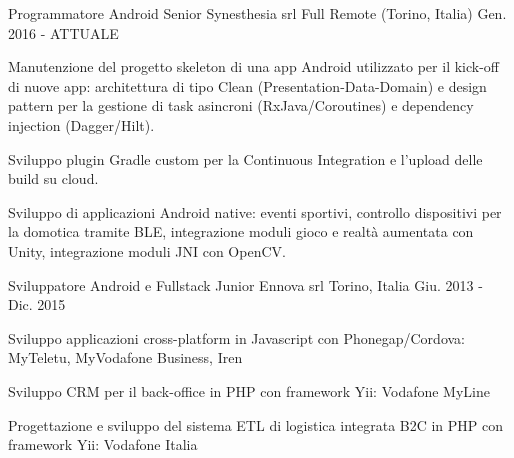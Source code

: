 


\begin{cventries}


\cventry
{Programmatore Android Senior} %
{Synesthesia srl} %
{Full Remote (Torino, Italia)} %
{Gen. 2016 - ATTUALE} %
{ %
	\begin{cvitems}
		\item {Manutenzione del progetto skeleton di una app Android utilizzato per il kick-off di nuove app: architettura di tipo Clean (Presentation-Data-Domain) e design pattern per la gestione di task asincroni (RxJava/Coroutines) e dependency injection (Dagger/Hilt).}
		\item {Sviluppo plugin Gradle custom per la Continuous Integration e l'upload delle build su cloud.}
		\item {Sviluppo di applicazioni Android native: eventi sportivi, controllo dispositivi per la domotica tramite BLE, integrazione moduli gioco e realtà aumentata con Unity, integrazione moduli JNI con OpenCV.}
	\end{cvitems}
}


\cventry
{Sviluppatore Android e Fullstack Junior} %
{Ennova srl} %
{Torino, Italia} %
{Giu. 2013 - Dic. 2015} %
{ %
	\begin{cvitems}
		\item {Sviluppo applicazioni cross-platform in Javascript con Phonegap/Cordova: MyTeletu, MyVodafone Business, Iren}
		\item {Sviluppo CRM per il back-office in PHP con framework Yii: Vodafone MyLine}
		\item {Progettazione e sviluppo del sistema ETL di logistica integrata B2C in PHP con framework Yii: Vodafone Italia}
	\end{cvitems}
}


\end{cventries}